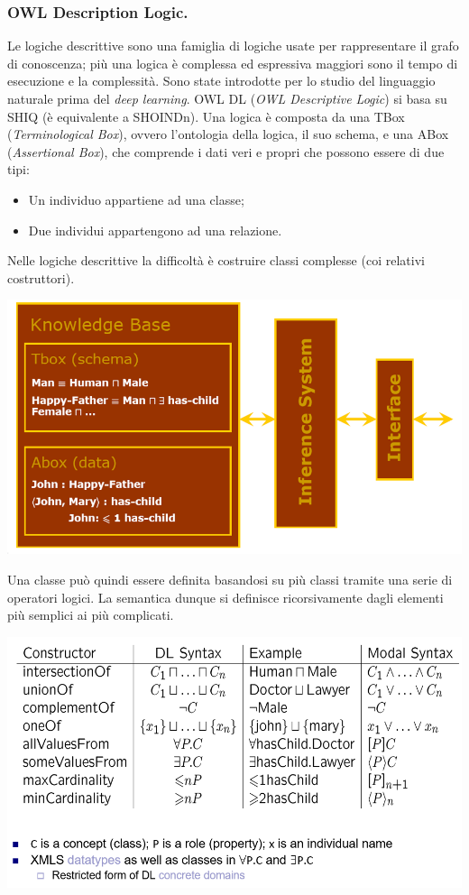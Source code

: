 \documentclass[11pt]{article}
\begin{document}
\subsubsection{OWL Description Logic.}
Le logiche descrittive sono una famiglia di logiche usate per rappresentare il grafo di conoscenza; più una logica è complessa ed espressiva maggiori sono il tempo di esecuzione e la complessità.
Sono state introdotte per lo studio del linguaggio naturale prima del \textit{deep learning}.
OWL DL (\textit{OWL Descriptive Logic}) si basa su SHIQ (è equivalente a SHOINDn).
Una logica è composta da una TBox (\textit{Terminological Box}), ovvero l'ontologia della logica, il suo schema, e una ABox (\textit{Assertional Box}), che comprende i dati veri e propri che possono essere di due tipi:
\begin{itemize}
\item Un individuo appartiene ad una classe;
\item Due individui appartengono ad una relazione.
\end{itemize}
Nelle logiche descrittive la difficoltà è costruire classi complesse (coi relativi costruttori). \newline
\begin{center}
	\includegraphics[scale=0.4]{IMG1.png}
\end{center}
Una classe può quindi essere definita basandosi su più classi tramite una serie di operatori logici.
La semantica dunque si definisce ricorsivamente dagli elementi più semplici ai più complicati.
\begin{center}
\includegraphics[scale=0.5]{IMG2.png}
\end{center}
\end{document}
